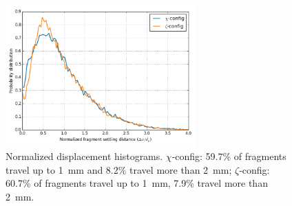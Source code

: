 \documentclass[11pt]{report} %
\begin{document}
\begin{figure}[!t]
    \centering
    \includegraphics[width = 0.65\textwidth]{images/displacement_histograms.png}
    \caption{Normalized displacement histograms. $\chi$-config: 59.7\% of fragments travel up to \SI{1}{\milli\meter} and 8.2\% travel more than \SI{2}{\milli\meter}; $\zeta$-config: 60.7\% of fragments travel up to \SI{1}{\milli\meter}, 7.9\% travel more than \SI{2}{\milli\meter}.}\label{fig:displacement_hists}
\end{figure}
\end{document}
